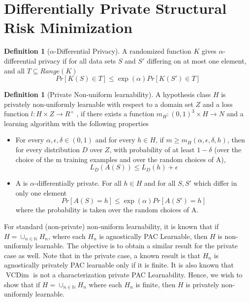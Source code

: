 \documentclass[a4paper]{article}
\DeclareMathOperator{\vcdim}{VCDim}
\theoremstyle{definition}
\newtheorem{definition}[theorem]{Definition}
\theoremstyle{remark}
\begin{document}

\section{Differentially Private Structural Risk Minimization}

\begin{definition}[$\alpha$-Differential Privacy]
A randomized function $K$ gives $α$-differential privacy if for all data sets $S$ and $S'$ differing on at most one element, and all $T \subseteq Range(K)$
$$Pr [K(S) \in T] \le \exp(\alpha) Pr [K(S') \in T]$$
\end{definition}

\begin{definition}[Private Non-uniform learnability] A hypothesis class $H$ is privately non-uniformly learnable with respect to a domain set $Z$ and a loss function $l: H \times Z \rightarrow R^+$ , if there exists a function $m_H: (0, 1)^3\times H \rightarrow N$ and a learning algorithm with the following properties
\begin{itemize}[nolistsep,noitemsep]
\item For every $\alpha, \epsilon, \delta \in (0, 1)$ and for every $h \in H$, if $m \ge m_H(\alpha, \epsilon, \delta, h)$, then for every distribution $D$ over $Z$, with probability of at least $1-\delta$ (over the choice of the m training examples and over the random choices of A),
$$L_D(A(S)) \le L_D(h) + \epsilon$$
\item A is $\alpha$-differentially private. For all $h \in H$ and for all $S, S'$ which differ in only one element
$$Pr [A(S) = h] \le \exp(\alpha) Pr [A(S') = h]$$
where the probability is taken over the random choices of A.
\end{itemize}
\end{definition}

\noindent For standard (non-private) non-uniform learnability, it is known that if $H = \cup_{n\in \mathbb{N}} H_n$, where each $H_n$ is agnostically PAC Learnable, then $H$ is non-uniformly learnable. The objective is to obtain a similar result for the private case as well. Note that in the private case, a known result is that $H_n$ is agnostically privately PAC learnable only if it is finite. It is also known that $\vcdim$ is not a characterization private PAC Learnability. Hence, we wish to show that if $H = \cup_{n \in \mathbb{N}}H_n$ where each $H_n$ is finite, then $H$ is privately non-uniformly learnable.
\end{document}
